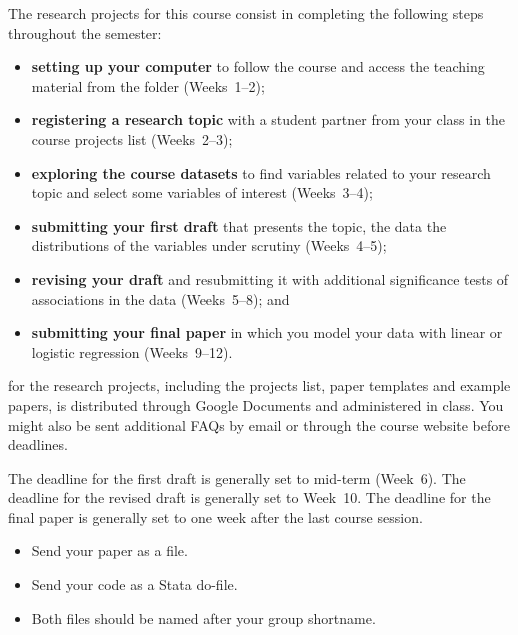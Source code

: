 The research projects for this course consist in completing the following steps throughout the semester:%

\begin{itemize}
  \item \textbf{setting up your computer} to follow the course and access the teaching material from the \SRQM folder (Weeks~1--2);%
  \item \textbf{registering a research topic} with a student partner from your class in the course projects list (Weeks~2--3);%
  \item \textbf{exploring the course datasets} to find variables related to your research topic and select some variables of interest (Weeks~3--4);%
  \item \textbf{submitting your first draft} that presents the topic, the data the distributions of the variables under scrutiny (Weeks~4--5);%
  \item \textbf{revising your draft} and resubmitting it with additional significance tests of associations in the data (Weeks~5--8); and%
  \item \textbf{submitting your final paper} in which you model your data with linear or logistic regression (Weeks~9--12).%
\end{itemize}

 for the research projects, including the projects list, paper templates and example papers, is distributed through Google Documents and administered in class. You might also be sent additional FAQs by email or through the course website before deadlines.%

 The deadline for the first draft is generally set to mid-term (Week~6). The deadline for the revised draft is generally set to Week~10. The deadline for the final paper is generally set to one week after the last course session.%

\begin{itemize}
  \item Send your paper as a \PDF file.
  \item Send your code as a Stata do-file.
  \item Both files should be named after your group shortname.
\end{itemize}

